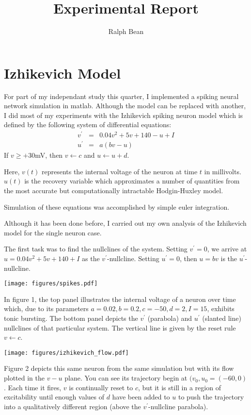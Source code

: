 \documentclass{elsart3p}
\begin{document}
\begin{frontmatter}

\title{Experimental Report}
\author{Ralph Bean}

\end{frontmatter}

\section{Izhikevich Model}
For part of my independant study this quarter, I implemented a spiking neural
network simulation in matlab.  Although the model can be replaced with another, I did most of my experiments with the Izhikevich spiking neuron model which is defined by the following system of differential equations:
\begin{eqnarray*}
v^{\prime} &=& 0.04v^{2} + 5v + 140 - u + I \\
u^{\prime} &=& a(bv - u)
\end{eqnarray*}
If $v \geq +30$mV, then $v \leftarrow c$ and $u \leftarrow u + d$.

Here, $v(t)$ represents the internal voltage of the neuron at time $t$ in millivolts.  $u(t)$ is the recovery variable which approximates a number of quantities from the most accurate but computationally intractable Hodgin-Huxley model.

Simulation of these equations was accomplished by simple euler integration.

Although it has been done before, I carried out my own analysis of the Izhikevich model for the single neuron case.

The first task was to find the nullclines of the system.  Setting $v^{\prime}=0$, we arrive at $u = 0.04v^{2} + 5v + 140 + I$ as the $v^{\prime}$-nullcline.  Setting $u^{\prime}=0$, then $u = bv$ is the $u^{\prime}$-nullcline.  


\texttt{[image: figures/spikes.pdf]}

In figure 1, the top panel illustrates the internal voltage of a neuron over time which, due to its parameters $a=0.02, b=0.2, c=-50, d=2, I=15$, exhibits tonic bursting.  The bottom panel depicts the $v^{\prime}$ (parabola) and $u^{\prime}$ (slanted line) nullclines of that particular system.  The vertical line is given by the reset rule $v \leftarrow c$.

\texttt{[image: figures/izhikevich\_flow.pdf]}

Figure 2 depicts this same neuron from the same simulation but with its flow plotted in the $v-u$ plane.  You can see its trajectory begin at $(v_{0}, u_{0} = (-60, 0)$.  Each time it fires, $v$ is continually reset to $c$, but it is still in a region of excitability until enough values of $d$ have been added to $u$ to push the trajectory into a qualitatively different region (above the $v^{\prime}$-nullcline parabola).
\end{document}
